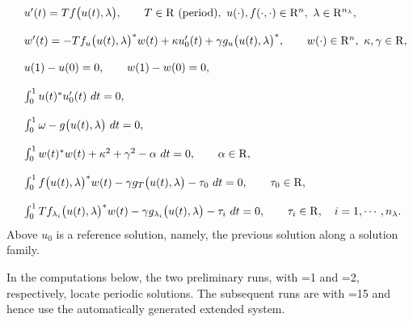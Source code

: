 \documentclass[12pt]{report}
\def\R{{\rm R}}
\def\Rn{{\rm R}^n}
\begin{document}
\begin{equation} \begin{array}{cl}
  &u'(t)  = T f \bigl( u(t),\lambda \bigr) ,
  \qquad T\in \R {\rm ~(period)},~ u(\cdot),f(\cdot,\cdot) \in \Rn, 
  ~ \lambda \in \R^{n_{\lambda}},  \\
  & \cr
  &w'(t)  = -Tf_u\bigl( u(t),\lambda \bigr)^{*} w(t) 
  + \kappa u_0'(t) 
  + \gamma g_u\bigl( u(t),\lambda \bigr)^{*}, 
  \qquad w(\cdot) \in \Rn,~ \kappa, \gamma \in \R, \\
  & \cr
  &u(1) - u(0) = 0, \qquad w(1) - w(0) = 0,  \\
  & \cr  
  &\int_{0}^{1} u(t)^{*} u_0'(t)~ dt = 0,  \\
  & \cr
  &\int_{0}^{1}  \omega - g\bigl(u(t),\lambda\bigr)  ~dt = 0,  \\
  & \cr
  &\int_0^{1}  w(t)^{*}w(t)
  + \kappa^2 + \gamma^{2} - \alpha ~ dt = 0, 
  \qquad \alpha \in \R,  \\ 
  & \cr
  &\int_0^{1}  f\bigl( u(t),\lambda \bigr)^{*}w(t) 
  - \gamma g_{T}\bigl( u(t),\lambda \bigr)
  - \tau_0  ~ dt= 0, \qquad \tau_0 \in \R,  \\
  & \cr
  &\int_0^{1}  T f_{\lambda_i}\bigl( u(t),\lambda \bigr)^{*}w(t)
  - \gamma g_{\lambda_i}\bigl( u(t),\lambda \bigr)
  - \tau_i  ~dt= 0, 
  \qquad \tau_i \in \R, \quad i=1, \cdots, n_{\lambda}.\\
\end{array} \end{equation}
Above  $u_0$ is a reference solution, namely, the previous solution along 
a solution family.  

\newpage
In the computations below, the two preliminary runs, with =1 and =2,
respectively, locate periodic solutions. 
The subsequent runs are with =15 and hence use the automatically
 generated extended system.
\end{document}
